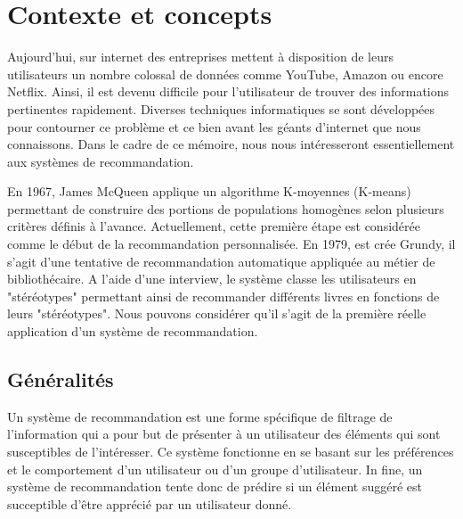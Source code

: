 \chapter{Contexte et concepts}



      

Aujourd'hui, sur internet des entreprises mettent à disposition de leurs utilisateurs un nombre colossal de données comme YouTube, Amazon ou encore Netflix. Ainsi, il est devenu difficile pour l'utilisateur de trouver des informations pertinentes rapidement. Diverses techniques informatiques se sont développées pour contourner ce problème et ce bien avant les géants d'internet que nous connaissons. Dans le cadre de ce mémoire, nous nous intéresseront essentiellement aux systèmes de recommandation.


\vspace{5mm}

En 1967\supercite{MACQUEEN}, James McQueen applique un algorithme K-moyennes (K-means) permettant de construire des portions de populations homogènes selon plusieurs critères définis à l’avance. Actuellement, cette première étape est considérée comme le début de la recommandation personnalisée. En 1979, est crée Grundy\supercite{Grundy}, il s'agit d'une tentative de recommandation automatique appliquée au métier de bibliothécaire. A l'aide d'une interview, le système classe les utilisateurs en "stéréotypes" permettant ainsi de recommander différents livres en fonctions de leurs "stéréotypes". Nous pouvons considérer qu'il s'agit de la première réelle application d'un système de recommandation. 



\section{Généralités}

Un système de recommandation est une forme spécifique de filtrage de l’information qui a pour but de présenter à un utilisateur des éléments qui sont susceptibles de l’intéresser. Ce système fonctionne en se basant sur les préférences et le comportement d'un utilisateur ou d'un groupe d'utilisateur. In fine, un système de recommandation tente donc de prédire si un élément suggéré est  succeptible d'être apprécié par un utilisateur donné. 

\vspace{5mm} 


